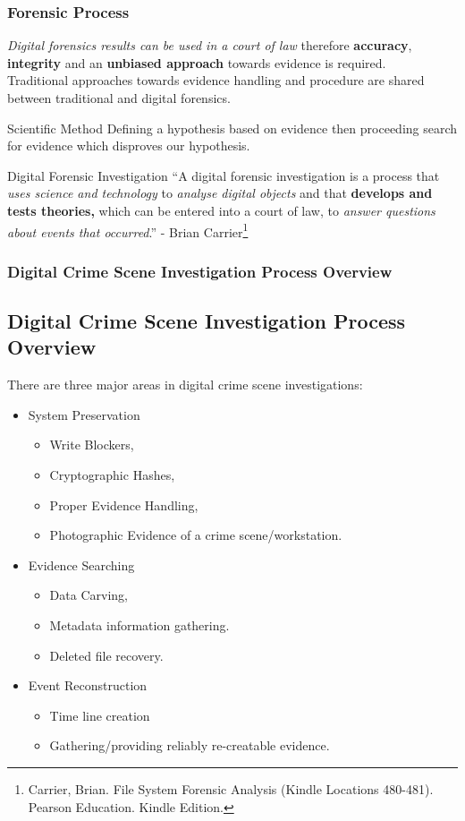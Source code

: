 \documentclass{beamer}
\begin{document}
\begin{frame}
	\frametitle{Forensic Process}
	\textit{Digital forensics results can be used in a court of law} therefore \textbf{accuracy}, \textbf{integrity} and an \textbf{unbiased approach} towards evidence is required.\\
	Traditional approaches towards evidence handling and procedure are shared between traditional and digital forensics.   
	\begin{block}{Scientific Method}
		Defining a hypothesis based on evidence then proceeding search for evidence which disproves our hypothesis.
	\end{block}
	\begin{block}{Digital Forensic Investigation}
	``A digital forensic investigation is a process that \textit{uses science
     and technology} to \textit{analyse digital objects} and that \textbf{develops and
     tests theories,} which can be entered into a court of law, to
     \textit{answer questions about events that occurred}.'' - Brian Carrier\footnote{\tiny{Carrier, Brian. File System Forensic Analysis (Kindle Locations 480-481). Pearson Education. Kindle Edition.}} 
	\end{block}
\end{frame}

\begin{frame}
	\frametitle{Digital Crime Scene Investigation Process Overview}
	\subsection*{Digital Crime Scene Investigation Process Overview}
	There are three major areas in digital crime scene investigations:
	\begin{itemize}
		\item System Preservation
			\begin{itemize}
				\item Write Blockers,
				\item Cryptographic Hashes,
				\item Proper Evidence Handling,
				\item Photographic Evidence of a crime scene/workstation.
			\end{itemize}
		\item Evidence Searching
			\begin{itemize}
				\item Data Carving,
				\item Metadata information gathering.
				\item Deleted file recovery. 
			\end{itemize}
		\item Event Reconstruction
			\begin{itemize}
				\item Time line creation
				\item Gathering/providing reliably re-creatable evidence. 
			\end{itemize}
	\end{itemize}
\end{frame}
\end{document}
